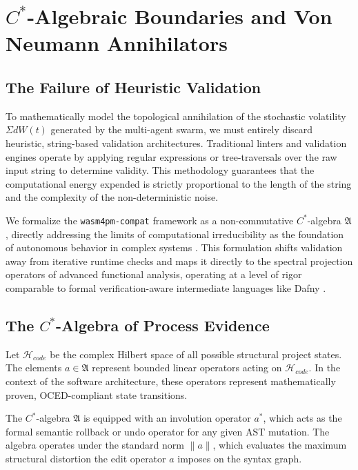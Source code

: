 \chapter{$C^*$-Algebraic Boundaries and Von Neumann Annihilators}
\label{ch:algebraic_boundary}

\section{The Failure of Heuristic Validation}

To mathematically model the topological annihilation of the stochastic volatility $\Sigma dW(t)$ generated by the multi-agent swarm, we must entirely discard heuristic, string-based validation architectures. Traditional linters and validation engines operate by applying regular expressions or tree-traversals over the raw input string to determine validity. This methodology guarantees that the computational energy expended is strictly proportional to the length of the string and the complexity of the non-deterministic noise. 

We formalize the \texttt{wasm4pm-compat} framework as a non-commutative $C^*$-algebra $\mathfrak{A}$, directly addressing the limits of computational irreducibility as the foundation of autonomous behavior in complex systems \cite{computational_irreducibility_agency_2024}. This formulation shifts validation away from iterative runtime checks and maps it directly to the spectral projection operators of advanced functional analysis, operating at a level of rigor comparable to formal verification-aware intermediate languages like Dafny \cite{dafny_verification_aware_2024}.

\section{The $C^*$-Algebra of Process Evidence}

Let $\mathcal{H}_{code}$ be the complex Hilbert space of all possible structural project states. The elements $a \in \mathfrak{A}$ represent bounded linear operators acting on $\mathcal{H}_{code}$. In the context of the software architecture, these operators represent mathematically proven, OCED-compliant state transitions.

The $C^*$-algebra $\mathfrak{A}$ is equipped with an involution operator $a^*$, which acts as the formal semantic rollback or undo operator for any given AST mutation. The algebra operates under the standard norm $\|a\|$, which evaluates the maximum structural distortion the edit operator $a$ imposes on the syntax graph.

